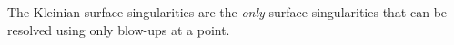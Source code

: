 \begin{thm}
The Kleinian surface singularities are the \emph{only} surface singularities that can be resolved using only blow-ups at a point. 
\end{thm}





























